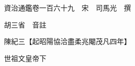 










 


 
 


 

  
  
  
  
  





  
  
  
  
  
 
  

  

  
  
  



  

 
 

  
   




  

  
  


  　　資治通鑑卷一百六十九　宋　司馬光　撰

　　胡三省　音註

　　陳紀三【起昭陽協洽盡柔兆閹茂凡四年】

　　世祖文皇帝下

